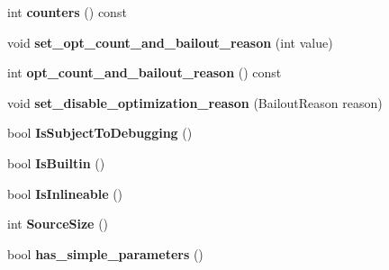 \begin{DoxyCompactItemize}
\item 
int {\bfseries counters} () const \hypertarget{classv8_1_1internal_1_1_shared_function_info_a40be83281a87b2753bb4e7653b1752ad}{}\label{classv8_1_1internal_1_1_shared_function_info_a40be83281a87b2753bb4e7653b1752ad}

\item 
void {\bfseries set\+\_\+opt\+\_\+count\+\_\+and\+\_\+bailout\+\_\+reason} (int value)\hypertarget{classv8_1_1internal_1_1_shared_function_info_ab161c64dd00bdd9b16af06b52bf35b1a}{}\label{classv8_1_1internal_1_1_shared_function_info_ab161c64dd00bdd9b16af06b52bf35b1a}

\item 
int {\bfseries opt\+\_\+count\+\_\+and\+\_\+bailout\+\_\+reason} () const \hypertarget{classv8_1_1internal_1_1_shared_function_info_ac056efeabe472b9f110026311ffb08d8}{}\label{classv8_1_1internal_1_1_shared_function_info_ac056efeabe472b9f110026311ffb08d8}

\item 
void {\bfseries set\+\_\+disable\+\_\+optimization\+\_\+reason} (Bailout\+Reason reason)\hypertarget{classv8_1_1internal_1_1_shared_function_info_aa547e84ec9b931b2cb26b68f366be26d}{}\label{classv8_1_1internal_1_1_shared_function_info_aa547e84ec9b931b2cb26b68f366be26d}

\item 
bool {\bfseries Is\+Subject\+To\+Debugging} ()\hypertarget{classv8_1_1internal_1_1_shared_function_info_a0b1c9061a9ec4dbbc6f732f506b0fdf3}{}\label{classv8_1_1internal_1_1_shared_function_info_a0b1c9061a9ec4dbbc6f732f506b0fdf3}

\item 
bool {\bfseries Is\+Builtin} ()\hypertarget{classv8_1_1internal_1_1_shared_function_info_a2209d0eb80c0cb47f5bf7b42b734cfef}{}\label{classv8_1_1internal_1_1_shared_function_info_a2209d0eb80c0cb47f5bf7b42b734cfef}

\item 
bool {\bfseries Is\+Inlineable} ()\hypertarget{classv8_1_1internal_1_1_shared_function_info_aab93be19f41a3a1c3cc52c0ef0590794}{}\label{classv8_1_1internal_1_1_shared_function_info_aab93be19f41a3a1c3cc52c0ef0590794}

\item 
int {\bfseries Source\+Size} ()\hypertarget{classv8_1_1internal_1_1_shared_function_info_a6e3ea25186cfb597d5ef46ff6e9ffab9}{}\label{classv8_1_1internal_1_1_shared_function_info_a6e3ea25186cfb597d5ef46ff6e9ffab9}

\item 
bool {\bfseries has\+\_\+simple\+\_\+parameters} ()\hypertarget{classv8_1_1internal_1_1_shared_function_info_a16e3068b54bc4eed747b3cb426b5faf1}{}\label{classv8_1_1internal_1_1_shared_function_info_a16e3068b54bc4eed747b3cb426b5faf1}


\end{DoxyCompactItemize}
